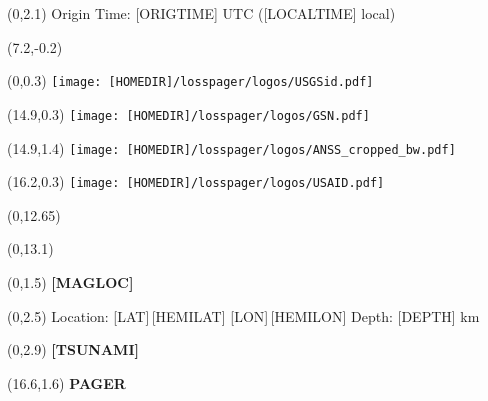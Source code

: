 \documentclass[6pt]{article}
\begin{document}
\selectfont

\begin{textblock}{13.75}(0,2.1)
Origin Time: [ORIGTIME] UTC ([LOCALTIME] local) 
\end{textblock}

\begin{textblock}{5.5}(7.2,-0.2)
\end{textblock}
\begin{textblock}{3.2}(0,0.3)
\texttt{[image: [HOMEDIR]/losspager/logos/USGSid.pdf]}
\end{textblock}
\begin{textblock}{1.1}(14.9,0.3)
\texttt{[image: [HOMEDIR]/losspager/logos/GSN.pdf]}
\end{textblock}
\begin{textblock}{1.8}(14.9,1.4)
\texttt{[image: [HOMEDIR]/losspager/logos/ANSS\_cropped\_bw.pdf]}
\end{textblock}
\begin{textblock}{3.75}(16.2,0.3)
\texttt{[image: [HOMEDIR]/losspager/logos/USAID.pdf]}
\end{textblock}




\begin{textblock}{13.75}(0,12.65)
\end{textblock}
\begin{textblock}{13.75}(0,13.1)
\end{textblock}



\begin{textblock}{13.75}(0,1.5)
\fontsize{15}{18}\textbf{[MAGLOC]}
\end{textblock}



\begin{textblock}{13.75}(0,2.5)
Location: [LAT]\degree\,[HEMILAT] [LON]\degree\,[HEMILON] Depth: [DEPTH] km
\end{textblock}

\begin{textblock}{18}(0,2.9)
{\color{red}\textbf{[TSUNAMI]}}
\end{textblock}

\begin{textblock}{4}(16.6,1.6)
\hfill \fontsize{15}{18}\textbf{PAGER}\,
\end{textblock}
\end{document}
